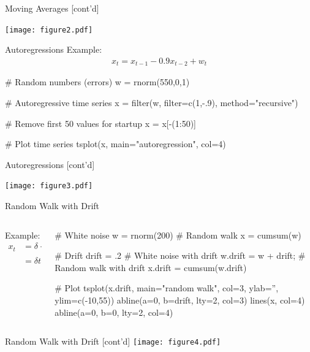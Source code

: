 \documentclass[ignorenonframetext,xcolor=x11names]{beamer}
\begin{document}
\begin{frame}{Moving Averages \small [cont'd]}
\centering

\texttt{[image: figure2.pdf]}
\end{frame}

\begin{frame}[fragile]{Autoregressions}
Example:
\begin{align*}x_t = x_{t-1} - 0.9 x_{t-2} + w_t\end{align*}
\begin{Rcode}
# Random numbers (errors)
w = rnorm(550,0,1)

# Autoregressive time series
x = filter(w, filter=c(1,-.9), method="recursive")

# Remove first 50 values for startup
x = x[-(1:50)]

# Plot time series
tsplot(x, main="autoregression", col=4)
\end{Rcode}
\end{frame}

\begin{frame}{Autoregressions \small [cont'd]}
\centering

\texttt{[image: figure3.pdf]}
\end{frame}

\begin{frame}[fragile]{Random Walk with Drift}
\begin{columns}
\begin{column}{.4\textwidth}
Example:
\begin{align*}x_t &= \delta + x_{t-1} + w_t \\
&= \delta t + \sum_{j=1}^t w_j\end{align*}
\end{column}
\begin{column}{.7\textwidth}
\begin{Rcode}
# White noise
w = rnorm(200)
# Random walk
x = cumsum(w)

# Drift
drift = .2
# White noise with drift
w.drift = w + drift;
# Random walk with drift
x.drift = cumsum(w.drift)

# Plot
tsplot(x.drift, main="random walk", col=3, 
       ylab='', ylim=c(-10,55))
abline(a=0, b=drift, lty=2, col=3)
lines(x, col=4)
abline(a=0, b=0, lty=2, col=4)
\end{Rcode}
\end{column}
\end{columns}
\end{frame}

\begin{frame}{Random Walk with Drift \small [cont'd]}
\texttt{[image: figure4.pdf]}
\end{frame}
\end{document}
